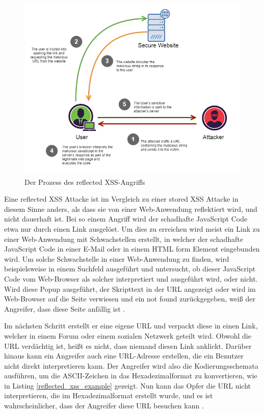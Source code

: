 \begin{figure}[ht]
	\centering
	\includegraphics[width=1\linewidth]{images/medium/2_reflected_xss.png}
	\caption[Der Prozess des reflected XSS-Angriffs]
	{Der Prozess des reflected XSS-Angriffs \textcite{makarem2018a}}
\end{figure}

Eine reflected XSS Attacke ist im Vergleich zu einer stored XSS Attacke in diesem Sinne anders, als dass sie von einer Web-Anwendung reflektiert wird, und nicht dauerhaft ist. Bei so einem Angriff wird der schadhafte JavaScript Code etwa nur durch einen Link ausgelöst.
Um dies zu erreichen wird meist ein Link zu einer Web-Anwendung mit Schwachstellen erstellt, in welcher der schadhafte JavaScript Code in einer E-Mail oder in einem HTML form Element eingebunden wird. Um solche Schwachstelle in einer Web-Anwendung zu finden, wird beispielsweise in einem Suchfeld ausgeführt und untersucht, ob dieser JavaScript Code vom Web-Browser als solcher interpretiert und ausgeführt wird, oder nicht.
Wird diese Popup ausgeführt, der Skripttext in der URL angezeigt oder wird im Web-Browser auf die Seite verwiesen und ein not found zurückgegeben, weiß der Angreifer, dass diese Seite anfällig ist \autocite[125]{gupta2015a}.

Im nächsten Schritt erstellt er eine eigene URL und verpackt diese in einen Link, welcher in einem Forum oder einem sozialen Netzwerk geteilt wird. Obwohl die URL verdächtig ist, heißt es nicht, dass niemand diesen Link anklickt. Darüber hinaus kann ein Angreifer auch eine URL-Adresse erstellen, die ein Benutzer nicht direkt interpretieren kann. Der Angreifer wird also die Kodierungsschemata ausführen, um die ASCII-Zeichen in das Hexadezimalformat zu konvertieren, wie in Listing \ref{reflected_xss_example} gezeigt. Nun kann das Opfer die URL nicht interpretieren, die im Hexadezimalformat erstellt wurde, und es ist wahrscheinlicher, dass der Angreifer diese URL besuchen kann \autocite[125]{gupta2015a}.

